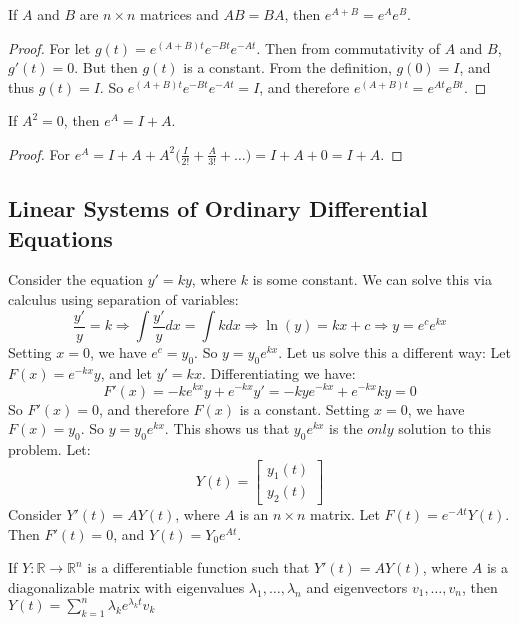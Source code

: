 \documentclass[crop=false,class=book]{standalone}
\begin{document}
\begin{theorem}
If $A$ and $B$ are $n\times n$ matrices and $AB=BA$, then $e^{A+B} = e^{A}e^{B}$.
\end{theorem}
\begin{proof}
For let $g(t) = e^{(A+B)t}e^{-Bt}e^{-At}$. Then from commutativity of $A$ and $B$, $g'(t) = 0$. But then $g(t)$ is a constant. From the definition, $g(0) = I$, and thus $g(t) = I$. So $e^{(A+B)t}e^{-Bt}e^{-At} = I$, and therefore $e^{(A+B)t} = e^{At}e^{Bt}$.
\end{proof}
\begin{theorem}
If $A^{2} = 0$, then $e^{A} = I+A$.
\end{theorem}
\begin{proof}
For $e^{A} = I+A+A^{2}\big(\frac{I}{2!}+\frac{A}{3!}+\hdots\big) = I+A+0 = I+A$.
\end{proof}
\subsection{Linear Systems of Ordinary Differential Equations}
Consider the equation $y' = ky$, where $k$ is some constant. We can solve this via calculus using separation of variables:
\begin{equation*}
    \frac{y'}{y} = k\Rightarrow \int \frac{y'}{y}dx = \int kdx \Rightarrow \ln(y) = kx+c \Rightarrow y = e^c e^{kx}    
\end{equation*}
Setting $x=0$, we have $e^c = y_0$. So $y = y_0e^{kx}$. Let us solve this a different way: Let $F(x) = e^{-kx}y$, and let $y'=kx$. Differentiating we have:
\begin{equation*}
    F'(x)=-ke^{kx}y+e^{-kx}y'=-kye^{-kx}+e^{-kx}ky=0    
\end{equation*}
So $F'(x) = 0$, and therefore $F(x)$ is a constant. Setting $x=0$, we have $F(x) = y_0$. So $y = y_0e^{kx}$. This shows us that $y_0e^{kx}$ is the $only$ solution to this problem. Let:
\begin{equation*}
    Y(t) = \begin{bmatrix} y_1(t) \\ y_2(t)\end{bmatrix}    
\end{equation*}
Consider $Y'(t) = AY(t)$, where $A$ is an $n\times n$ matrix. Let $F(t) = e^{-At}Y(t)$. Then $F'(t) = 0$, and $Y(t) = Y_0 e^{At}$.
\begin{theorem}
If $Y:\mathbb{R}\rightarrow \mathbb{R}^n$ is a differentiable function such that $Y'(t) = AY(t)$, where $A$ is a diagonalizable matrix with eigenvalues $\lambda_1,\hdots, \lambda_n$ and eigenvectors $v_1,\hdots, v_n$, then $Y(t) = \sum_{k=1}^{n} \lambda_k e^{\lambda_k t}v_k$
\end{theorem}
\end{document}
